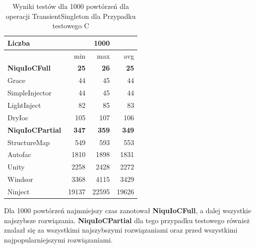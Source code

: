 \documentclass[12pt]{article}
\begin{document}
\begin{table}[H]
\captionsetup{belowskip=0pt,aboveskip=0pt}
\begin{center}
\begin{small}
	\begin{tabular}{ | l | r r r | }
    		\hline
Liczba & & 1000 & \\ \hline
 & min & max & avg \\ \hline
\textbf{NiquIoCFull} & \textbf{25} & \textbf{26} & \textbf{25} \\ \hline
Grace & 44 & 45 & 44 \\ \hline
SimpleInjector & 44 & 45 & 44 \\ \hline
LightInject & 82 & 85 & 83 \\ \hline
DryIoc & 105 & 107 & 106 \\ \hline
\textbf{NiquIoCPartial} & \textbf{347} & \textbf{359} & \textbf{349} \\ \hline
StructureMap & 549 & 593 & 553 \\ \hline
Autofac & 1810 & 1898 & 1831 \\ \hline
Unity & 2258 & 2428 & 2272 \\ \hline
Windsor & 3368 & 4115 & 3429 \\ \hline
Ninject & 19137 & 22595 & 19626 \\ \hline
  	\end{tabular}
\end{small}
\end{center}
\caption{Wyniki testów dla 1000 powtórzeń dla operacji TransientSingleton dla Przypadku testowego C}
\label{TestCaseC_TransientSingleton1000}
\end{table}
Dla 1000 powtórzeń najmniejszy czas zanotował \textbf{NiquIoCFull}, a dalej wszystkie najszybsze rozwiązania. \textbf{NiquIoCPartial} dla tego przypadku testowego również znalazł się za wszystkimi najszybszymi rozwiązaniami oraz przed wszystkimi najpopularniejszymi rozwiązaniami.
\end{document}
